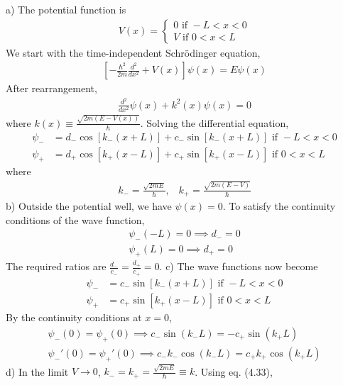 \documentclass[12pt]{book} %
\numberwithin{equation}{chapter}
\begin{document}
\begin{solbox}
a) The potential function is
\begin{align*}
V(x)=
\begin{cases}
0\text{ if }-L<x<0\\
V\text{ if }0<x<L
\end{cases}
\end{align*}
We start with the time-independent Schr\"{o}dinger equation,
\begin{align*}
\left[-\frac{\hbar^{2}}{2m}\frac{d^{2}}{dx^{2}}+V(x)\right]\psi(x)=E\psi(x)
\end{align*}
After rearrangement,
\begin{align*}
\frac{d^{2}}{dx^{2}}\psi(x)+k^{2}(x)\psi(x)=0
\end{align*}
where $k(x)\equiv\frac{\sqrt{2m(E-V(x))}}{\hbar}$. Solving the differential equation,
\begin{align*}
\psi_{-}&=d_{-}\cos{\left[k_{-}(x+L)\right]}+c_{-}\sin{\left[k_{-}(x+L)\right]}\text{ if }-L<x<0\\
\psi_{+}&=d_{+}\cos{\left[k_{+}(x-L)\right]}+c_{+}\sin{\left[k_{+}(x-L)\right]}\text{ if }0<x<L
\end{align*}
where
\begin{align*}
k_{-}=\frac{\sqrt{2mE}}{\hbar},\,\,\,\,\,k_{+}=\frac{\sqrt{2m(E-V)}}{\hbar}
\end{align*}
b) Outside the potential well, we have $\psi(x)=0$. To satisfy the continuity conditions of the wave function,
\begin{align*}
\psi_{-}(-L)=0\implies d_{-}=0\\
\psi_{+}(L)=0\implies d_{+}=0
\end{align*}
The required ratios are $\frac{d_{-}}{c_{-}}=\frac{d_{+}}{c_{+}}=0$.
\bigskip\newline
c) The wave functions now become
\begin{align*}
\psi_{-}&=c_{-}\sin{\left[k_{-}(x+L)\right]}\text{ if }-L<x<0\\
\psi_{+}&=c_{+}\sin{\left[k_{+}(x-L)\right]}\text{ if }0<x<L
\end{align*}
By the continuity conditions at $x=0$,
\begin{align}
\psi_{-}(0)=\psi_{+}(0)\implies c_{-}\sin(k_{-}L)=-c_{+}\sin(k_{+}L)\\
\psi_{-}'(0)=\psi_{+}'(0)\implies c_{-}k_{-}\cos(k_{-}L)=c_{+}k_{+}\cos(k_{+}L)
\end{align}
d) In the limit $V\to 0$, $k_{-}=k_{+}=\frac{\sqrt{2mE}}{\hbar}\equiv k$. Using eq. (4.33),

\end{solbox}
\end{document}
